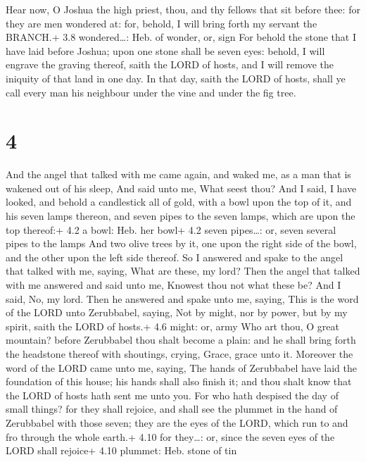  Hear now, O Joshua the high priest, thou, and thy fellows
that sit before thee: for they are men wondered at: for, behold, I will
bring forth my servant the BRANCH.+ 3.8 wondered\ldots: Heb. of wonder,
or, sign  For behold the stone that I have laid before
Joshua; upon one stone shall be seven eyes: behold, I will engrave the
graving thereof, saith the LORD of hosts, and I will remove the iniquity
of that land in one day.  In that day, saith the LORD of
hosts, shall ye call every man his neighbour under the vine and under
the fig tree.

\hypertarget{section-3}{%
\section{4}\label{section-3}}

 And the angel that talked with me came again, and waked me,
as a man that is wakened out of his sleep,  And said unto
me, What seest thou? And I said, I have looked, and behold a candlestick
all of gold, with a bowl upon the top of it, and his seven lamps
thereon, and seven pipes to the seven lamps, which are upon the top
thereof:+ 4.2 a bowl: Heb. her bowl+ 4.2 seven pipes\ldots: or, seven
several pipes to the lamps  And two olive trees by it, one
upon the right side of the bowl, and the other upon the left side
thereof.  So I answered and spake to the angel that talked
with me, saying, What are these, my lord?  Then the angel
that talked with me answered and said unto me, Knowest thou not what
these be? And I said, No, my lord.  Then he answered and
spake unto me, saying, This is the word of the LORD unto Zerubbabel,
saying, Not by might, nor by power, but by my spirit, saith the LORD of
hosts.+ 4.6 might: or, army  Who art thou, O great mountain?
before Zerubbabel thou shalt become a plain: and he shall bring forth
the headstone thereof with shoutings, crying, Grace, grace unto it.
 Moreover the word of the LORD came unto me, saying,
 The hands of Zerubbabel have laid the foundation of this
house; his hands shall also finish it; and thou shalt know that the LORD
of hosts hath sent me unto you.  For who hath despised the
day of small things? for they shall rejoice, and shall see the plummet
in the hand of Zerubbabel with those seven; they are the eyes of the
LORD, which run to and fro through the whole earth.+ 4.10 for
they\ldots: or, since the seven eyes of the LORD shall rejoice+ 4.10
plummet: Heb. stone of tin

